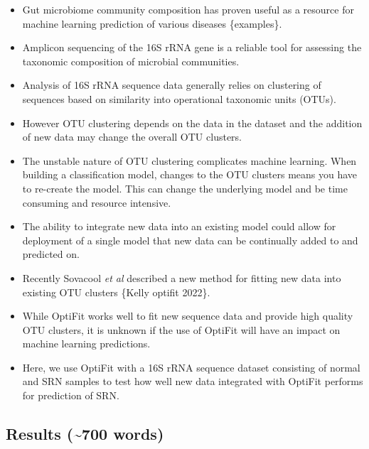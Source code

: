 \documentclass[
  11pt,
]{article}
\providecommand{\tightlist}{%
  \setlength{\itemsep}{0pt}\setlength{\parskip}{0pt}}
\begin{document}
\begin{itemize}
\tightlist
\item
  Gut microbiome community composition has proven useful as a resource
  for machine learning prediction of various diseases \{examples\}.
\item
  Amplicon sequencing of the 16S rRNA gene is a reliable tool for
  assessing the taxonomic composition of microbial communities.
\item
  Analysis of 16S rRNA sequence data generally relies on clustering of
  sequences based on similarity into operational taxonomic units (OTUs).
\item
  However OTU clustering depends on the data in the dataset and the
  addition of new data may change the overall OTU clusters.
\item
  The unstable nature of OTU clustering complicates machine learning.
  When building a classification model, changes to the OTU clusters
  means you have to re-create the model. This can change the underlying
  model and be time consuming and resource intensive.
\item
  The ability to integrate new data into an existing model could allow
  for deployment of a single model that new data can be continually
  added to and predicted on.
\item
  Recently Sovacool \emph{et al} described a new method for fitting new
  data into existing OTU clusters \{Kelly optifit 2022\}.
\item
  While OptiFit works well to fit new sequence data and provide high
  quality OTU clusters, it is unknown if the use of OptiFit will have an
  impact on machine learning predictions.
\item
  Here, we use OptiFit with a 16S rRNA sequence dataset consisting of
  normal and SRN samples to test how well new data integrated with
  OptiFit performs for prediction of SRN.
\end{itemize}

\hypertarget{results-700-words}{%
\subsection{Results (\textasciitilde700
words)}\label{results-700-words}}
\end{document}
